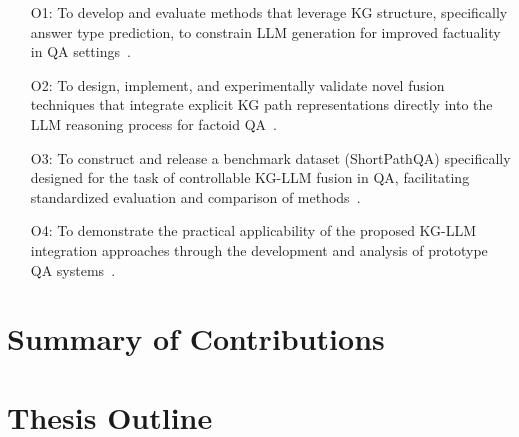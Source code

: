 \begin{enumerate}
    \item[O1:] To develop and evaluate methods that leverage KG structure, specifically answer type prediction, to constrain LLM generation for improved factuality in QA settings~\cite{DBLP:journals/corr/abs-2310-07008}.
    
    \item[O2:] To design, implement, and experimentally validate novel fusion techniques that integrate explicit KG path representations directly into the LLM reasoning process for factoid QA~\cite{DBLP:journals/corr/abs-2310-02166}.
    
    \item[O3:] To construct and release a benchmark dataset (ShortPathQA) specifically designed for the task of controllable KG-LLM fusion in QA, facilitating standardized evaluation and comparison of methods~\cite{sakhovskiy-etal-2024-textgraphs}. %

    \item[O4:] To demonstrate the practical applicability of the proposed KG-LLM integration approaches through the development and analysis of prototype QA systems~\cite{DBLP:conf/acl/RazzhigaevSMBP23, DBLP:conf/coling/ShalloufHSVMPBN24}.
\end{enumerate}


\section{Summary of Contributions}
\label{sec:intro_contributions}


\section{Thesis Outline}
\label{sec:intro_outline}
